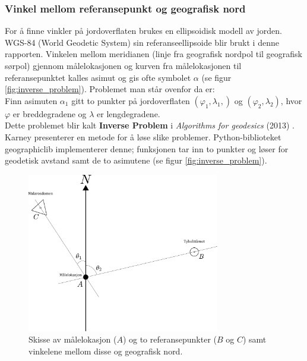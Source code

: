 \subsubsection{Vinkel mellom referansepunkt og geografisk nord}

For å finne vinkler på jordoverflaten brukes en ellipsoidisk modell av jorden.
WGS-84 (World Geodetic System) sin referanseellipsoide blir brukt i denne rapporten.
Vinkelen mellom meridianen (linje fra geografisk nordpol til geografisk sørpol) gjennom målelokasjonen og 
kurven fra målelokasjonen til referansepunktet kalles asimut \cite{asimut} og gis ofte symbolet $\alpha$ (se figur \ref{fig:inverse_problem}).
Problemet man står ovenfor da er:
\\

Finn asimuten $\alpha_1$ gitt to punkter på jordoverflaten $(\varphi_1, \lambda_1, )$ og $(\varphi_2, \lambda_2)$, hvor $\varphi$ er breddegradene og $\lambda$ er lengdegradene. 
\\

Dette problemet blir kalt \textbf{Inverse Problem} i \textit{Algorithms for geodesics} (2013) \cite{Karney}. Karney presenterer en metode for å løse slike problemer. Python-biblioteket geographiclib implementerer denne; funksjonen  tar inn to punkter og løser for geodetisk avstand samt de to asimutene \cite{geographiclib} (se figur \ref{fig:inverse_problem}).

\begin{figure}
    \centering
    \includegraphics[width=0.75\textwidth]{img/angle_north.pdf}
    \caption{
    Skisse av målelokasjon ($A$) og to referansepunkter ($B$ og $C$) samt vinkelene mellom disse og geografisk nord.}
    \label{fig:angle_north}
\end{figure}


